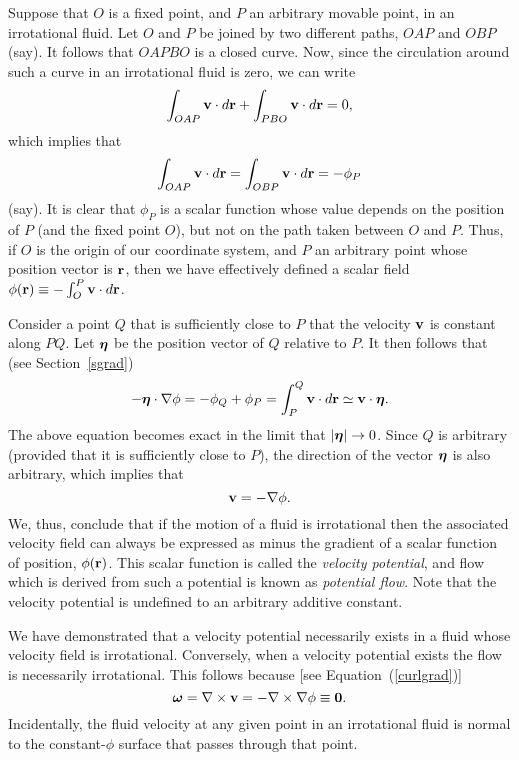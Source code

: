 Suppose that $O$ is a fixed point, and $P$ an arbitrary movable point, in an irrotational fluid. Let $O$ and $P$ be joined
by two different paths, $OAP$ and $OBP$ (say). It follows that $OAPBO$ is a closed curve. Now, since the circulation
around such a curve in an irrotational fluid is zero, we can write
\begin{equation}
\int_{OAP} {\bf v}\cdot d{\bf r} + \int_{PBO} {\bf v}\cdot d{\bf r} = 0,
\end{equation}
which implies that
\begin{equation}
\int_{OAP} {\bf v}\cdot d{\bf r} =\int_{OBP} {\bf v}\cdot d{\bf r} = -\phi_P
\end{equation}
(say). It is clear that $\phi_P$ is a scalar function whose value depends  on the
position of $P$ (and the fixed point $O$), but not on the path taken between $O$ and $P$.
Thus, if $O$ is the origin of our coordinate system, and $P$ an arbitrary point whose position
vector is ${\bf r}$, then we have effectively defined a scalar field $\phi({\bf r})\equiv-\int_O^P {\bf v}\cdot d{\bf r}$.

Consider a point $Q$ that is sufficiently close to $P$ that the velocity ${\bf v}$ is constant along $PQ$. 
Let $\mbox{\boldmath$\eta$}$ be the position vector of $Q$ relative to $P$. It  then follows that (see Section~\ref{sgrad})
\begin{equation}
-\mbox{\boldmath$\eta$}\cdot\nabla\phi = -\phi_Q+\phi_P = \int_{P}^Q {\bf v}\cdot d{\bf r} \simeq {\bf v}\cdot \mbox{\boldmath$\eta$}.
\end{equation}
The above equation becomes exact in the limit that $|\mbox{\boldmath$\eta$}|\rightarrow 0$. Since $Q$ is arbitrary (provided that it is
sufficiently close to $P$), the
direction of the vector $\mbox{\boldmath$\eta$}$ is also arbitrary, which implies that
\begin{equation}\label{e3.51t}
{\bf v} = -\nabla\phi.
\end{equation}
We, thus, conclude that if the motion of a fluid is irrotational then the associated velocity field can always be expressed as minus the
gradient of a scalar function of position, $\phi({\bf r})$. This scalar function is called the {\em velocity potential}, and
flow which is derived from such a potential is known as {\em potential flow}. Note that the velocity potential
is undefined to an arbitrary additive constant.

We have demonstrated that a velocity potential necessarily exists in a fluid whose velocity field is irrotational. 
Conversely, when a velocity potential exists the flow is necessarily irrotational. This follows because [see Equation~(\ref{curlgrad})]
\begin{equation}
\mbox{\boldmath$\omega$}=\nabla\times {\bf v} = -\nabla\times\nabla\phi\equiv {\bf 0}.
\end{equation}
Incidentally, the fluid velocity at any given point in an irrotational fluid is normal to the constant-$\phi$ surface that
passes through that point. 

